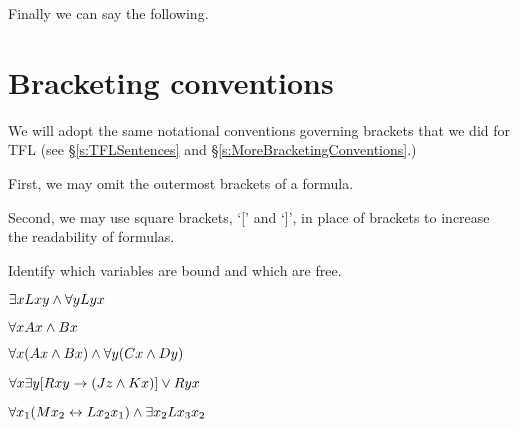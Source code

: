Finally we can say the following.	




\section{Bracketing conventions}

We will adopt the same notational conventions governing brackets that we did for TFL (see \S\ref{s:TFLSentences} and \S\ref{s:MoreBracketingConventions}.) 

First, we may omit the outermost brackets of a formula. 

Second, we may use square brackets, `[' and `]', in place of brackets to increase the readability of formulas. 



\practiceproblems
\problempart
\label{pr.freeFOL}
Identify which variables are bound and which are free.
\begin{earg}
\item $\exists x Lxy \wedge \forall y Lyx$
\item $\forall x Ax \wedge Bx$
\item $\forall x (Ax \wedge Bx) \wedge \forall y(Cx \wedge Dy)$
\item $\forall x\exists y[Rxy \rightarrow (Jz \wedge Kx)] \vee Ryx$
\item $\forall x_1(Mx_2 \leftrightarrow Lx_2x_1) \wedge \exists x_2 Lx_3x_2$
\end{earg}
